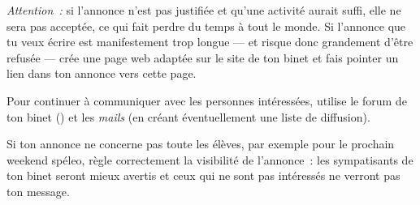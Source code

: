 \emph{Attention~:} si l'annonce n'est pas justifiée et qu'une activité aurait suffi, elle ne sera pas acceptée, ce qui fait perdre du temps à tout le
monde. Si l'annonce que tu veux écrire est manifestement trop longue --- et risque donc grandement d'être refusée --- crée une page web adaptée sur le
site de ton binet et fais pointer un lien dans ton annonce vers cette page.

Pour continuer à communiquer avec les personnes intéressées, utilise
le forum de ton binet () et les \emph{mails}
(en créant éventuellement une liste de diffusion).

Si ton annonce ne concerne pas toute les élèves, par
exemple pour le prochain weekend spéleo, règle correctement la
visibilité de l'annonce~: les sympatisants de ton binet seront mieux
avertis et ceux qui ne sont pas intéressés ne verront pas ton message.
